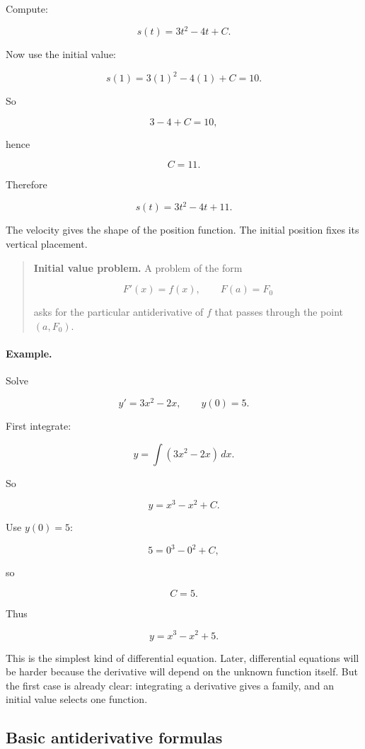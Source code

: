 Compute:

\[
s(t)=3t^2-4t+C.
\]

Now use the initial value:

\[
s(1)=3(1)^2-4(1)+C=10.
\]

So

\[
3-4+C=10,
\]

hence

\[
C=11.
\]

Therefore

\[
\boxed{
s(t)=3t^2-4t+11.
}
\]

The velocity gives the shape of the position function.  The initial position fixes its
vertical placement.

\begin{quote}
\textbf{Initial value problem.}
A problem of the form

\[
F'(x)=f(x),
\qquad
F(a)=F_0
\]

asks for the particular antiderivative of \(f\) that passes through the point
\((a,F_0)\).
\end{quote}

\paragraph{Example.}
Solve

\[
y'=3x^2-2x,
\qquad
y(0)=5.
\]

First integrate:

\[
y=\int (3x^2-2x)\,dx.
\]

So

\[
y=x^3-x^2+C.
\]

Use \(y(0)=5\):

\[
5=0^3-0^2+C,
\]

so

\[
C=5.
\]

Thus

\[
\boxed{
y=x^3-x^2+5.
}
\]

This is the simplest kind of differential equation.  Later, differential equations will be
harder because the derivative will depend on the unknown function itself.  But the
first case is already clear: integrating a derivative gives a family, and an initial value
selects one function.

\subsection{Basic antiderivative formulas}
\label{subsec:basic-antiderivative-formulas}

